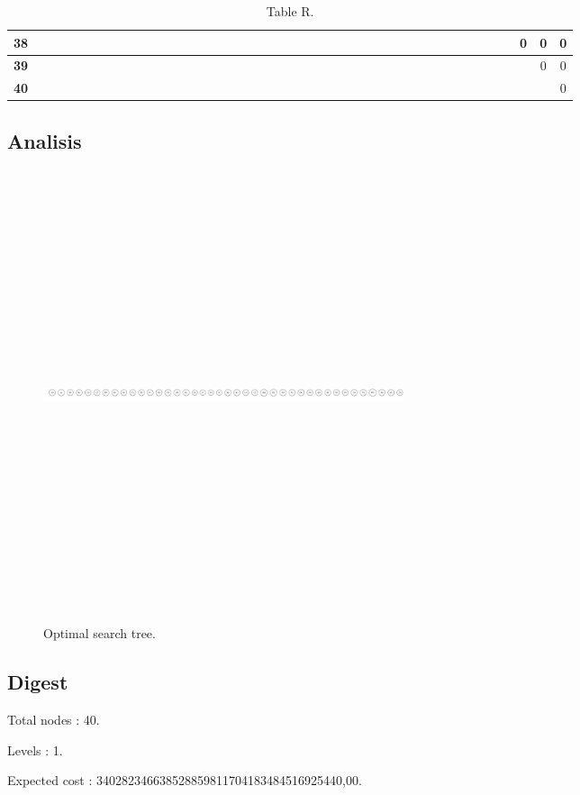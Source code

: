 \documentclass{article}
\begin{document}
\begin{table}[!ht]
\begin{adjustwidth}{-3cm}{-3cm}
\begin{tabular}{c||c|c|c|c|c|c|c|c|c|c|c|c|c|c|c|c|c|c|c|c|c|c|c|c|c|c|c|c|c|c|c|c|c|c|c|c|c|c|c|c|c|}
\multicolumn{1}{|c||}{\cellcolor{gray90}\textbf{38}} &  &  &  &  &  &  &  &  &  &  &  &  &  &  &  &  &  &  &  &  &  &  &  &  &  &  &  &  &  &  &  &  &  &  &  &  &  &  & 0 & 0 & 0 \\ \hline
\multicolumn{1}{|c||}{\cellcolor{gray90}\textbf{39}} &  &  &  &  &  &  &  &  &  &  &  &  &  &  &  &  &  &  &  &  &  &  &  &  &  &  &  &  &  &  &  &  &  &  &  &  &  &  &  & 0 & 0 \\ \hline
\multicolumn{1}{|c||}{\cellcolor{gray90}\textbf{40}} &  &  &  &  &  &  &  &  &  &  &  &  &  &  &  &  &  &  &  &  &  &  &  &  &  &  &  &  &  &  &  &  &  &  &  &  &  &  &  &  & 0 \\ \hline
\end{tabular}
\caption{Table R.}
\end{adjustwidth}
\end{table}


\subsection{Analisis}
\begin{figure}[H]\centering
\noindent\includegraphics[height=500px, width=400px, keepaspectratio]{reports/tree.pdf}
\caption{Optimal search tree.}
\end{figure}
\newpage

\subsection{Digest}
\begin{compactitem}
\item Total nodes : {\Large 40}.
\item Levels : {\Large 1}.
\item Expected cost : {\Large 340282346638528859811704183484516925440,00}.
\end{compactitem}
\end{document}
